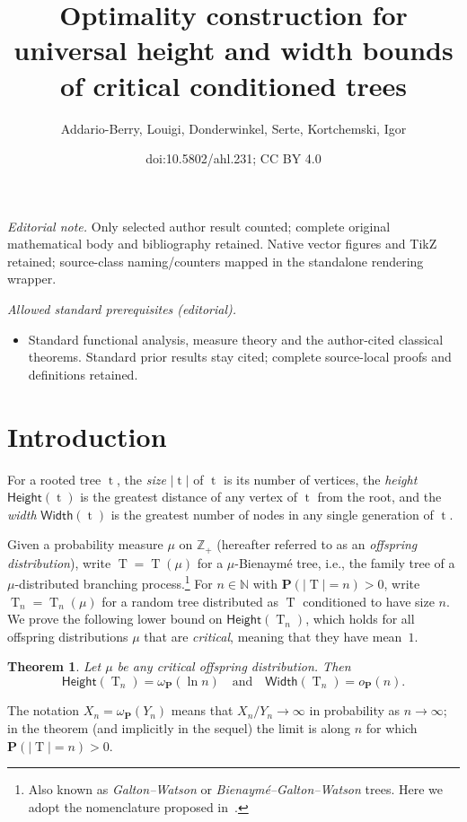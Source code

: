 \documentclass[10pt]{amsart}
\title{Optimality construction for universal height and width bounds of critical conditioned trees}
\author{Addario-Berry, Louigi, Donderwinkel, Serte, Kortchemski, Igor}
\date{doi:10.5802/ahl.231; CC BY 4.0}
\newtheorem{theo}{Theorem}[section]
\theoremstyle{definition}\newtheorem{defi}[theo]{Definition}\newtheorem{rema}[theo]{Remark}\newtheorem{exam}[theo]{Example}\newtheorem{exem}[theo]{Example}\newtheorem{nota}[theo]{Notation}
\newcommand{\Z}{\mathbb{Z}}
\newcommand{\N}{\mathbb{N}}
\renewcommand{\H}{\mathsf{Height}}
\newcommand{\p}{\mathbf{P}}
\newcommand{\Width}{\mathsf{Width}}
\DeclareMathOperator{\tree}{t}
\DeclareMathOperator{\rtree}{T}
\begin{document}
\maketitle
\noindent\textit{Editorial note.} Only selected author result counted; complete original mathematical body and bibliography retained. Native vector figures and TikZ retained; source-class naming/counters mapped in the standalone rendering wrapper.\par\medskip
\noindent\textit{Allowed standard prerequisites (editorial).}\begin{itemize}
\item Standard functional analysis, measure theory and the author-cited classical theorems. Standard prior results stay cited; complete source-local proofs and definitions retained.
\end{itemize}\medskip



\section{Introduction}

For a rooted tree $\tree$, the \emph{size} $|\tree|$ of $\tree$ is its number of vertices, the \emph{height} $\H(\tree)$ is the greatest distance of any vertex of $\tree$ from the root, and the \emph{width} $\Width(\tree)$ is the greatest number of nodes in any single generation of $\tree$.

Given a probability measure $\mu$ on $\Z_{+}$ (hereafter referred to as an \emph{offspring distribution}), write $\rtree=\rtree(\mu)$ for a $\mu$-Bienaymé tree, i.e., the family tree of a $\mu$-distributed branching process.\footnote{Also known as \emph{Galton--Watson} or \emph{Bienaymé--Galton--Watson} trees. Here we adopt the nomenclature proposed in~\cite{ABHK21}.} For $n \in \N$ with $\p(|\rtree|=n)>0$, write $\rtree_n=\rtree_n(\mu)$ for a random tree distributed as $\rtree$ conditioned to have size $n$. We prove the following lower bound on $\H(\rtree_n)$, which holds for all offspring distributions $\mu$ that are \emph{critical}, meaning that they have mean~$1$.
\begin{theo}\label{thm:height_critical0}
Let $\mu$ be any critical offspring distribution. Then
\[
\H(\rtree_{n}) = \omega_{\p}(\ln n)
\quad \text{and} \quad
\Width(\rtree_n)=o_{\p}(n).
\]
\end{theo}

The notation $X_n = \omega_{\p}(Y_n)$ means that $X_n/Y_n \to \infty$ in probability as $n \to \infty$; in the theorem (and implicitly in the sequel) the limit is along $n$ for which $\p(|\rtree|=n)>0$.
\end{document}
